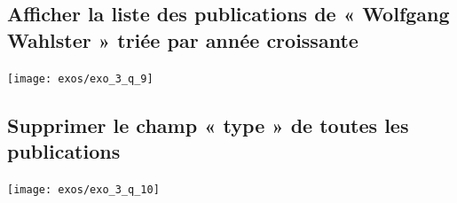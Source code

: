 \documentclass[12pt,a4paper]{article}
\begin{document}
\subsection{Afficher la liste des publications de « Wolfgang Wahlster » triée par année croissante}

\begin{center}
	\texttt{[image: exos/exo\_3\_q\_9]}
\end{center}

\subsection{Supprimer le champ « type » de toutes les publications}

\begin{center}
	\texttt{[image: exos/exo\_3\_q\_10]}
\end{center}
\end{document}
